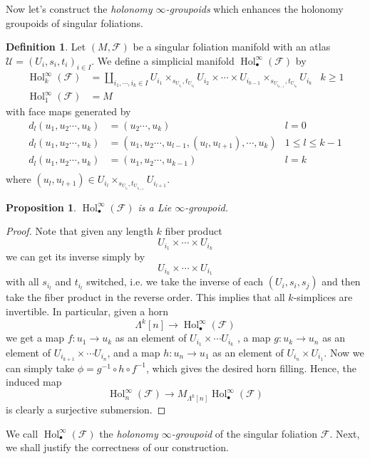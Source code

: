 \documentclass[12pt]{amsart}
\newtheorem{prop}[thm]{Proposition}
\theoremstyle{definition}
\newtheorem{defn}[thm]{Definition}
\theoremstyle{remark}
\numberwithin{equation}{section}
\newcommand{\CF}{{\mathcal F}}
\newcommand{\1}{{\mathbb{1}}}
\newcommand{\bt}{\bullet}
\newcommand{\hol}{\operatorname{Hol}}
\begin{document}
Now let's construct the {\it holonomy $\infty$-groupoids} which enhances the holonomy groupoids of singular foliations.

\begin{defn}
    Let $(M, \CF)$ be a singular foliation manifold with an atlas $\mathcal{U}= (U_i, s_i, t_i)_{i\in I}$. We define a simplicial manifold $\hol^{\infty}_{\bt}(\CF)$ by
    \begin{align*}
        \hol^{\infty}_k(\CF) &= \coprod_{i_1,\cdots, i_k \in I} U_{i_1}\times_{s_{U_{i_1}}, t_{U_{i_2}}} U_{i_2}\times\cdots \times U_{i_{k-1}}\times_{s_{U_{i_{k-1}}}, t_{U_{i_k}}} U_{i_k} &k\ge 1\\
        \hol^{\infty}_1(\CF) &= M
    \end{align*}
    with face maps generated by
    \begin{align*}
        d_l(u_1,u_2\cdots, u_k) &= (u_2\cdots, u_k) & l = 0\\
        d_l(u_1,u_2\cdots, u_k) &= (u_1,u_2\cdots,u_{l-1}, (u_l, u_{l+1}),\cdots, u_k) & 1\le l \le k-1\\
        d_l(u_1,u_2\cdots, u_k)  &=(u_1,u_2\cdots, u_{k-1}) & l = k\\
    \end{align*}
    where $(u_l, u_{l+1}) \in U_{i_l}\times_{{s_{U_{i_l}}}, t_{U_{i_{l+1}}}} U_{i_{l+1}}$. 
\end{defn}

\begin{prop}
    $\hol^{\infty}_{\bt}(\CF)$ is a Lie $\infty$-groupoid.
\end{prop}
\begin{proof}
    Note that given any length $k$ fiber product
    \begin{equation*}
        U_{i_1}\times\cdots \times U_{i_k}
    \end{equation*}
    we can get its inverse simply by
    \begin{equation*}
        U_{i_k}\times\cdots \times U_{i_1}
    \end{equation*}
    with all $s_{i_l}$ and  $t_{i_l}$ switched, i.e. we take the inverse of each $(U_i, s_i, s_j)$ and then take the fiber product in the reverse order. This implies that all $k$-simplices are invertible. In particular, given a horn
    \begin{equation*}
        \Lambda^k[n] \to \hol^{\infty}_{\bt}(\CF)
    \end{equation*}
    we get a map $f:u_1 \to u_k$ as an element of $U_{i_1}\times \cdots U_{i_k}$
    , a map $g:u_k \to u_n$ as an element of $U_{i_{k+1}}\times \cdots U_{i_n}$, and a map $h:u_n\to u_1$ as an element of $U_{i_n}\times U_{i_1}$. Now we can simply take $\phi= g^{-1}\circ h \circ f^{-1}$, which gives the desired horn filling. Hence, the induced map
    \begin{equation*}
        \hol^{\infty}_{n}(\CF) \to M_{\Lambda^k[n]}\hol^{\infty}_{\bt}(\CF)
    \end{equation*}
    is clearly a surjective submersion.
\end{proof}
We call $\hol^{\infty}_{\bt}(\CF)$ the {\it holonomy $\infty$-groupoid} of the singular foliation $\CF$. Next, we shall justify the correctness of our construction. 
\end{document}
